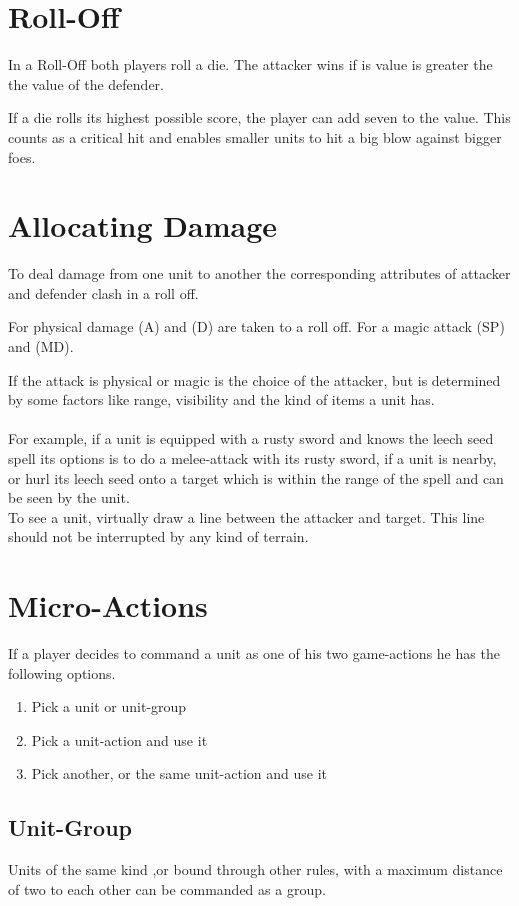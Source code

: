 \documentclass[a5paper,pagesize,10pt,bibtotoc,pointlessnumbers,
normalheadings,DIV=9,twoside=false]{scrbook}
\begin{document}
\section{Roll-Off}
In a Roll-Off both players roll a die. The attacker wins if is value is greater the the value of the defender.

If a die rolls its highest possible score, the player can add seven to the value. This counts as a critical hit and enables smaller units to hit a big blow against bigger foes.

\section{Allocating Damage}
To deal damage from one unit to another the corresponding attributes of attacker and defender clash in a roll off.

For physical damage (A) and (D) are taken to a roll off. For a magic attack (SP) and (MD).

If the attack is physical or magic is the choice of the attacker, but is determined by some factors like range, visibility and the kind of items a unit has.\\
\\
For example, if a unit is equipped with a rusty sword and knows the leech seed spell its options is to do a melee-attack with its rusty sword, if a unit is nearby, or hurl its leech seed onto a target which is within the range of the spell and can be seen by the unit.\\
To see a unit, virtually draw a line between the attacker and target. This line should not be interrupted by any kind of terrain.

\section{Micro-Actions}
If a player decides to command a unit as one of his two game-actions he has the following options.

\begin{enumerate}
\item Pick a unit or unit-group
\item Pick a unit-action and use it
\item Pick another, or the same unit-action and use it
\end{enumerate}

\subsection{Unit-Group}
Units of the same kind ,or bound through other rules, with a maximum distance of two to each other can be commanded as a group.
\end{document}
